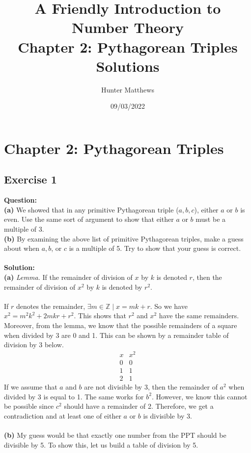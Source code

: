 \documentclass{article}
\title{%
  A Friendly Introduction to Number Theory \\
  \large Chapter 2: Pythagorean Triples \\
    Solutions}
\author{Hunter Matthews}
\date{09/03/2022}
\begin{document}
\maketitle
\newpage
\tableofcontents
\newpage
\section{Chapter 2: Pythagorean Triples}
\subsection{Exercise 1}
\textbf{Question:}\\
\textbf{(a)} We showed that in any primitive Pythagorean triple ($a, b, c$), either $a$ or $b$ is even. Use the same sort of argument to show that either $a$ or $b$ must be a multiple of 3.\\
\textbf{(b)} By examining the above list of primitive Pythagorean triples, make a guess about when $a, b$, or $c$ is a multiple of 5. Try to show that your guess is correct.\\
\\\textbf{Solution:}\\
\textbf{(a)} \emph{Lemma.} If the remainder of division of $x$ by $k$ is denoted $r$, then the remainder of division of $x^{2}$ by $k$ is denoted by $r^{2}$.\\\\ If $r$ denotes the remainder, $\exists m\in \mathbb{Z}\mid x = mk+r$. So we have $x^{2} = m^{2}k^{2}+2mkr+r^{2}$. This shows that $r^{2}$ and $x^{2}$ have the same remainders. Moreover, from the lemma, we know that the possible remainders of a square when divided by 3 are 0 and 1. This can be shown by a remainder table of division by 3 below.
\begin{displaymath}
\begin{array}{c|c}
x & x^2\\
\hline
0 & 0\\
1 & 1\\
2 & 1
\end{array}
\end{displaymath}
If we assume that $a$ and $b$ are not divisible by 3, then the remainder of $a^{2}$ when divided by 3 is equal to 1. The same works for $b^{2}$. However, we know this cannot be possible since $c^{2}$ should have a remainder of 2. Therefore, we get a contradiction and at least one of either $a$ or $b$ is divisible by 3.\\
\\\textbf{(b)} My guess would be that exactly one number from the PPT should be divisible by 5. To show this, let us build a table of division by 5.
\end{document}
